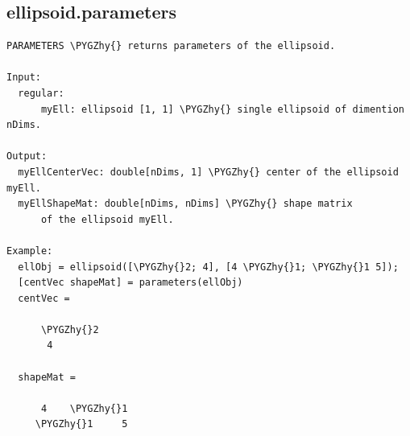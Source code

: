\documentclass[letterpaper,10pt,english]{sphinxmanual}
\def\PYGZhy{\char`\-}
\begin{document}
\subsection{ellipsoid.parameters}
\label{chap_functions:ellipsoid-parameters}
\begin{Verbatim}[commandchars=\\\{\}]
PARAMETERS \PYGZhy{} returns parameters of the ellipsoid.

Input:
  regular:
      myEll: ellipsoid [1, 1] \PYGZhy{} single ellipsoid of dimention nDims.

Output:
  myEllCenterVec: double[nDims, 1] \PYGZhy{} center of the ellipsoid myEll.
  myEllShapeMat: double[nDims, nDims] \PYGZhy{} shape matrix
      of the ellipsoid myEll.

Example:
  ellObj = ellipsoid([\PYGZhy{}2; 4], [4 \PYGZhy{}1; \PYGZhy{}1 5]);
  [centVec shapeMat] = parameters(ellObj)
  centVec =

      \PYGZhy{}2
       4

  shapeMat =

      4    \PYGZhy{}1
     \PYGZhy{}1     5
\end{Verbatim}
\end{document}
